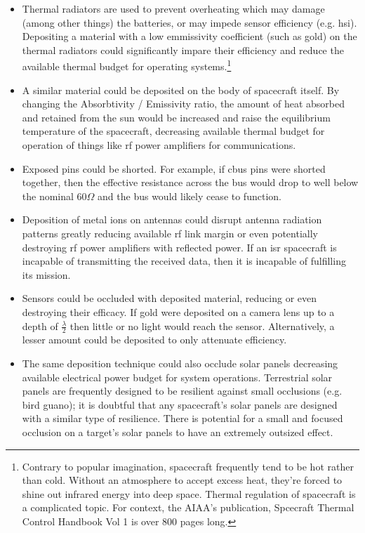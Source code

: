 \begin{itemize}

\item Thermal radiators are used to prevent overheating which may
  damage (among other things) the batteries, or may impede sensor
  efficiency (e.g. \acf{hsi}).  Depositing a material with a low
  emmissivity coefficient (such as gold) on the thermal radiators
  could significantly impare their efficiency and reduce the available
  thermal budget for operating systems.\footnote{Contrary to popular
  imagination, spacecraft frequently tend to be hot rather than cold.
  Without an atmosphere to accept excess heat, they're forced to shine
  out infrared energy into deep space.  Thermal regulation of
  spacecraft is a complicated topic.  For context, the AIAA's
  publication, Spcecraft Thermal Control Handbook Vol 1
  \cite{thermals} is over 800 pages long.}

\item A similar material could be deposited on the body of spacecraft
  itself.  By changing the Absorbtivity / Emissivity ratio, the amount
  of heat absorbed and retained from the sun would be increased and
  raise the equilibrium temperature of the spacecraft, decreasing
  available thermal budget for operation of things like \ac{rf} power
  amplifiers for communications.

\item Exposed pins could be shorted.  For example, if \ac{cbus} pins
  were shorted together, then the effective resistance across the bus
  would drop to well below the nominal $60\Omega$ and the bus would
  likely cease to function.

\item Deposition of metal ions on antennas could disrupt antenna
  radiation patterns greatly reducing available \ac{rf} link margin or
  even potentially destroying \ac{rf} power amplifiers with reflected
  power.  If an \ac{isr} spacecraft is incapable of transmitting the
  received data, then it is incapable of fulfilling its mission.

\item Sensors could be occluded with deposited material, reducing or
  even destroying their efficacy.  If gold were deposited on a camera
  lens up to a depth of $\frac{\lambda}{2}$ then little or no light
  would reach the sensor.  Alternatively, a lesser amount could be
  deposited to only attenuate efficiency.
  
\item The same deposition technique could also occlude solar panels
  decreasing available electrical power budget for system operations.
  Terrestrial solar panels are frequently designed to be resilient
  against small occlusions (e.g. bird guano); it is doubtful that any
  spacecraft's solar panels are designed with a similar type of
  resilience.  There is potential for a small and focused occlusion on
  a target's solar panels to have an extremely outsized effect.


\end{itemize}
